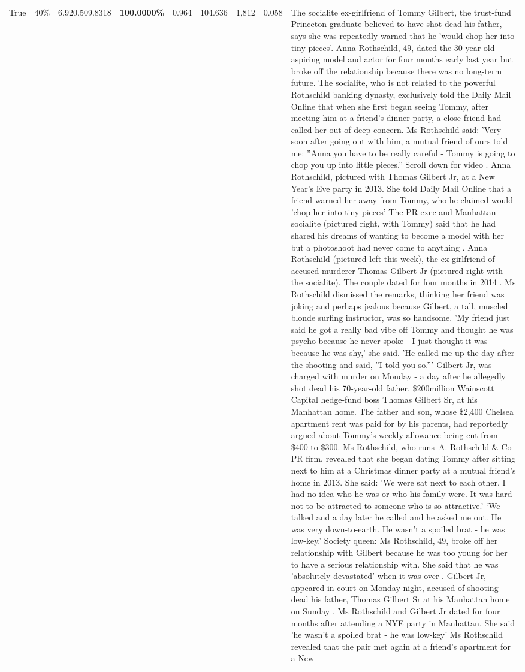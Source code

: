 \begin{table}[H]
\begin{tabular}{lllrlllll}
True & 40\% & 6,920,509.8318 & \bfseries \color{red} 100.0000\% & 0.964 & 104.636 & 1,812 & 0.058 & The socialite ex-girlfriend of Tommy Gilbert, the trust-fund Princeton graduate believed to have shot dead his father, says she was repeatedly warned that he 'would chop her into tiny pieces'. Anna Rothschild, 49, dated the 30-year-old aspiring model and actor for four months early last year but broke off the relationship because there was no long-term future. The socialite, who is not related to the powerful Rothschild banking dynasty, exclusively told the Daily Mail Online that when she first began seeing Tommy, after meeting him at a friend's dinner party, a close friend had called her out of deep concern. Ms Rothschild said: 'Very soon after going out with him, a mutual friend of ours told me: ''Anna you have to be really careful - Tommy is going to chop you up into little pieces.'' Scroll down for video . Anna Rothschild, pictured with Thomas Gilbert Jr, at a New Year's Eve party in 2013. She told Daily Mail Online that a friend warned her away from Tommy, who he claimed would 'chop her into tiny pieces' The PR exec and Manhattan socialite (pictured right, with Tommy) said that he had shared his dreams of wanting to become a model with her but a photoshoot had never come to anything . Anna Rothschild (pictured left this week), the ex-girlfriend of accused murderer Thomas Gilbert Jr (pictured right with the socialite). The couple dated for four months in 2014 . Ms Rothschild dismissed the remarks, thinking her friend was joking and perhaps jealous because Gilbert, a tall, muscled blonde surfing instructor, was so handsome. 'My friend just said he got a really bad vibe off Tommy and thought he was psycho because he never spoke - I just thought it was because he was shy,' she said. 'He called me up the day after the shooting and said, ''I told you so.''' Gilbert Jr, was charged with murder on Monday - a day after he allegedly shot dead his 70-year-old father, \$200million Wainscott Capital hedge-fund boss Thomas Gilbert Sr, at his Manhattan home. The father and son, whose \$2,400 Chelsea apartment rent was paid for by his parents, had reportedly argued about Tommy's weekly allowance being cut from \$400 to \$300. Ms Rothschild, who runs A. Rothschild \& Co PR firm, revealed that she began dating Tommy after sitting next to him at a Christmas dinner party at a mutual friend's home in 2013. She said: 'We were sat next to each other. I had no idea who he was or who his family were. It was hard not to be attracted to someone who is so attractive.' ‘We talked and a day later he called and he asked me out. He was very down-to-earth. He wasn’t a spoiled brat - he was low-key.’ Society queen: Ms Rothschild, 49, broke off her relationship with Gilbert because he was too young for her to have a serious relationship with. She said that he was 'absolutely devastated' when it was over . Gilbert Jr, appeared in court on Monday night, accused of shooting dead his father, Thomas Gilbert Sr at his Manhattan home on Sunday . Ms Rothschild and Gilbert Jr dated for four months after attending a NYE party in Manhattan. She said 'he wasn't a spoiled brat - he was low-key' Ms Rothschild revealed that the pair met again at a friend’s apartment for a New 
\end{tabular}
\end{table}
